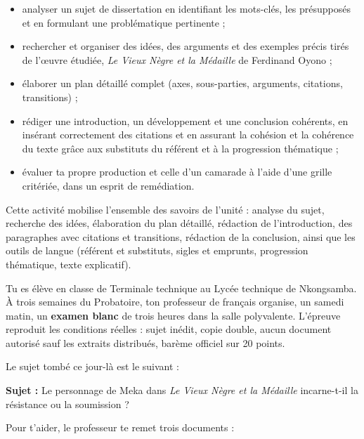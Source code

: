 \documentclass[11pt]{article}
\newcommand{\cle}[1]{{\popxbold\color{popdark}#1}}
\newcounter{popsec}
\newcounter{popsub}
\newcommand{\courssub}[1]{%
  \stepcounter{popsub}%
  \par\vspace{9pt}\noindent{\popxbold\fontsize{11.5}{13}\selectfont\color{popink}{\color{poporange}\thepopsec.\thepopsub}\hspace{6pt}#1}\par\nopagebreak\vspace{4pt}
}
\begin{document}
\begin{itemize}
\item analyser un sujet de dissertation en identifiant les \cle{mots-clés}, les \cle{présupposés} et en formulant une \cle{problématique} pertinente ;
\item rechercher et organiser des idées, des arguments et des exemples précis tirés de l'œuvre étudiée, \emph{Le Vieux Nègre et la Médaille} de Ferdinand Oyono ;
\item élaborer un \cle{plan détaillé} complet (axes, sous-parties, arguments, citations, transitions) ;
\item rédiger une introduction, un développement et une conclusion cohérents, en insérant correctement des citations et en assurant la \cle{cohésion} et la \cle{cohérence} du texte grâce aux substituts du référent et à la progression thématique ;
\item évaluer ta propre production et celle d'un camarade à l'aide d'une grille critériée, dans un esprit de remédiation.
\end{itemize}

Cette activité mobilise l'ensemble des savoirs de l'unité : analyse du sujet, recherche des idées, élaboration du plan détaillé, rédaction de l'introduction, des paragraphes avec citations et transitions, rédaction de la conclusion, ainsi que les outils de langue (référent et substituts, sigles et emprunts, progression thématique, texte explicatif).

\courssub{Situation}

Tu es élève en classe de Terminale technique au Lycée technique de Nkongsamba. À trois semaines du Probatoire, ton professeur de français organise, un samedi matin, un \textbf{examen blanc} de trois heures dans la salle polyvalente. L'épreuve reproduit les conditions réelles : sujet inédit, copie double, aucun document autorisé sauf les extraits distribués, barème officiel sur 20 points.

Le sujet tombé ce jour-là est le suivant :

\begin{definition}
\textbf{Sujet :} Le personnage de Meka dans \emph{Le Vieux Nègre et la Médaille} incarne-t-il la résistance ou la soumission ?
\end{definition}

Pour t'aider, le professeur te remet trois documents :
\end{document}
